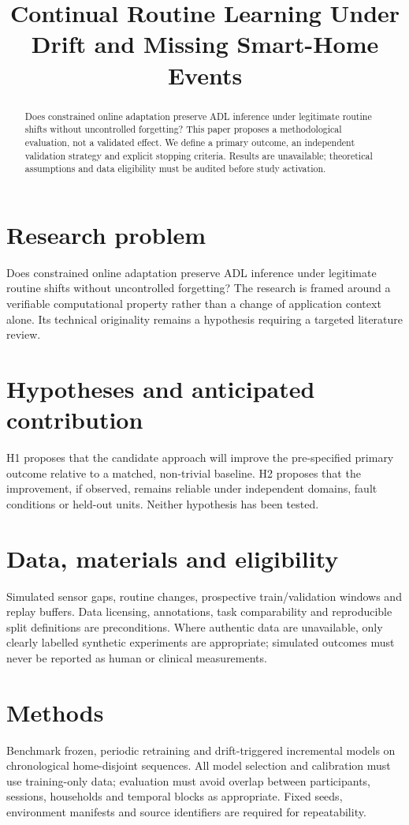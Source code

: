 \documentclass[11pt,a4paper]{article}
\title{Continual Routine Learning Under Drift and Missing Smart-Home Events}
\author{}
\date{}
\begin{document}
\maketitle
\begin{abstract}
Does constrained online adaptation preserve ADL inference under legitimate routine shifts without uncontrolled forgetting? This paper proposes a methodological evaluation, not a validated effect. We define a primary outcome, an independent validation strategy and explicit stopping criteria. Results are unavailable; theoretical assumptions and data eligibility must be audited before study activation.
\end{abstract}
\section{Research problem}
Does constrained online adaptation preserve ADL inference under legitimate routine shifts without uncontrolled forgetting? The research is framed around a verifiable computational property rather than a change of application context alone. Its technical originality remains a hypothesis requiring a targeted literature review.
\section{Hypotheses and anticipated contribution}
H1 proposes that the candidate approach will improve the pre-specified primary outcome relative to a matched, non-trivial baseline. H2 proposes that the improvement, if observed, remains reliable under independent domains, fault conditions or held-out units. Neither hypothesis has been tested.
\section{Data, materials and eligibility}
Simulated sensor gaps, routine changes, prospective train/validation windows and replay buffers. Data licensing, annotations, task comparability and reproducible split definitions are preconditions. Where authentic data are unavailable, only clearly labelled synthetic experiments are appropriate; simulated outcomes must never be reported as human or clinical measurements.
\section{Methods}
Benchmark frozen, periodic retraining and drift-triggered incremental models on chronological home-disjoint sequences. All model selection and calibration must use training-only data; evaluation must avoid overlap between participants, sessions, households and temporal blocks as appropriate. Fixed seeds, environment manifests and source identifiers are required for repeatability.
\end{document}
